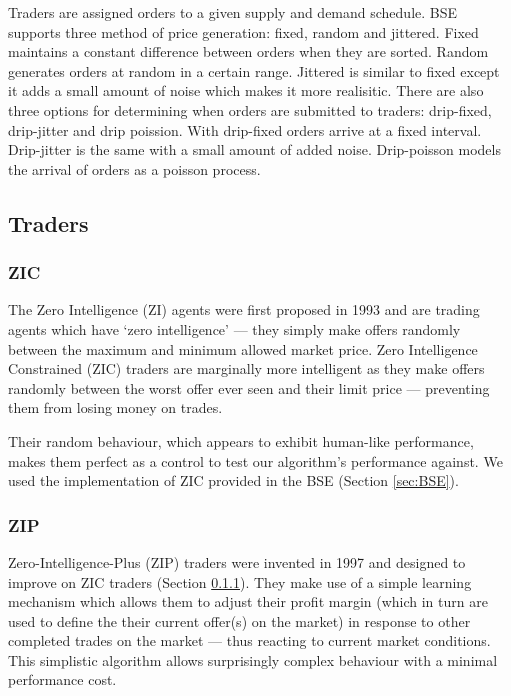 \documentclass[preprint]{acm_proc_article-sp} %
\begin{document}
Traders are assigned orders to a given supply and demand schedule. BSE supports three method of price generation: fixed, random and jittered. Fixed maintains a constant difference between orders when they are sorted. Random generates orders at random in a certain range. Jittered is similar to fixed except it adds a small amount of noise which makes it more realisitic. There are also three options for determining when orders are submitted to traders: drip-fixed, drip-jitter and drip poission. With drip-fixed orders arrive at a fixed interval. Drip-jitter is the same with a small amount of added noise. Drip-poisson models the arrival of orders as a poisson process.

\subsection{Traders} \label{sec:traders}
\subsubsection{ZIC} \label{sec:traders_ZIC}
The Zero Intelligence (ZI) agents were first proposed in 1993\cite{ZIC_paper} and are trading agents 
which have `zero intelligence' --- they simply make offers randomly between the maximum and minimum 
allowed market price. Zero Intelligence Constrained (ZIC) traders are marginally more intelligent as 
they make offers randomly between the worst offer ever seen and their limit price --- preventing them 
from losing money on trades.

Their random behaviour, which appears to exhibit human-like performance\cite[p.~1]{ZIP_paper1}, 
makes them perfect as a control to test our algorithm's performance against. We used the 
implementation of ZIC provided in the BSE (Section \ref{sec:BSE}).\\


\subsubsection{ZIP} \label{sec:traders_ZIP}
Zero-Intelligence-Plus (ZIP) traders were invented in 1997 and designed to improve on ZIC traders 
(Section \ref{sec:traders_ZIC})\cite{ZIP_paper1}. They make use of a simple learning mechanism which 
allows them to adjust their profit margin (which in turn are used to define the their current 
offer(s) on the market) in response to other completed trades on the market --- thus reacting to 
current market conditions. This simplistic algorithm allows surprisingly complex behaviour with a 
minimal performance cost.
\end{document}
